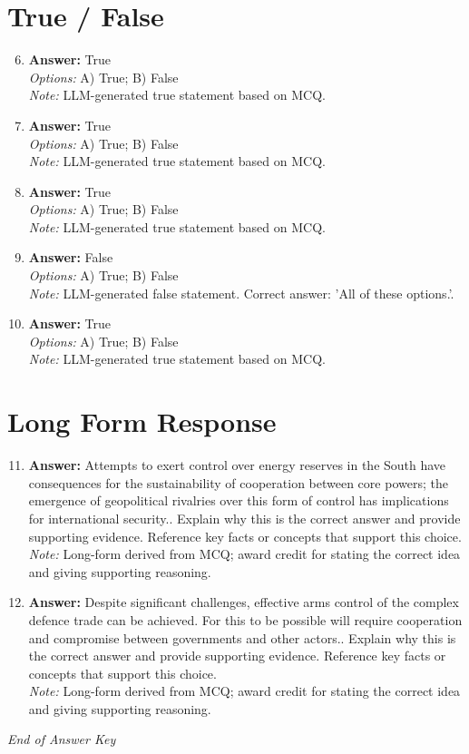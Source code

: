 \documentclass[12pt]{article}
\begin{document}
\section*{True / False}
\begin{enumerate}[label=\arabic*.]
\setcounter{enumi}{5}
\item \textbf{Answer:} True
\\ \textit{Options:} A) True; B) False
\\ \textit{Note:} LLM-generated true statement based on MCQ.
\item \textbf{Answer:} True
\\ \textit{Options:} A) True; B) False
\\ \textit{Note:} LLM-generated true statement based on MCQ.
\item \textbf{Answer:} True
\\ \textit{Options:} A) True; B) False
\\ \textit{Note:} LLM-generated true statement based on MCQ.
\item \textbf{Answer:} False
\\ \textit{Options:} A) True; B) False
\\ \textit{Note:} LLM-generated false statement. Correct answer: 'All of these options.'.
\item \textbf{Answer:} True
\\ \textit{Options:} A) True; B) False
\\ \textit{Note:} LLM-generated true statement based on MCQ.
\end{enumerate}

\section*{Long Form Response}
\begin{enumerate}[label=\arabic*.]
\setcounter{enumi}{10}
\item \textbf{Answer:} Attempts to exert control over energy reserves in the South have consequences for the sustainability of cooperation between core powers; the emergence of geopolitical rivalries over this form of control has implications for international security.. Explain why this is the correct answer and provide supporting evidence. Reference key facts or concepts that support this choice.
\\ \textit{Note:} Long-form derived from MCQ; award credit for stating the correct idea and giving supporting reasoning.
\item \textbf{Answer:} Despite significant challenges, effective arms control of the complex defence trade can be achieved. For this to be possible will require cooperation and compromise between governments and other actors.. Explain why this is the correct answer and provide supporting evidence. Reference key facts or concepts that support this choice.
\\ \textit{Note:} Long-form derived from MCQ; award credit for stating the correct idea and giving supporting reasoning.
\end{enumerate}

\vfill
\noindent\textit{End of Answer Key}
\end{document}
